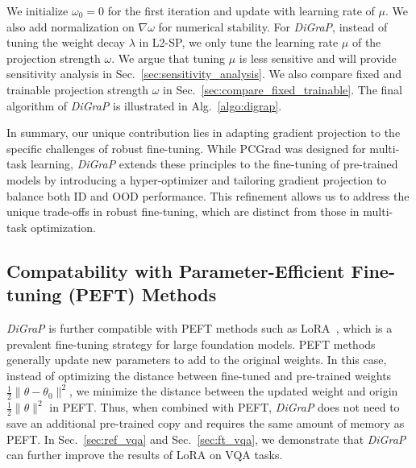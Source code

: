 We initialize $\omega_0=0$ for the first iteration and update with learning rate of $\mu$. We also add normalization on $\nabla\omega$ for numerical stability. For \emph{DiGraP}, instead of tuning the weight decay $\lambda$ in L2-SP, we only tune the learning rate $\mu$ of the projection strength $\omega$. {We argue that tuning $\mu$ is less sensitive and will provide sensitivity analysis in Sec.~\ref{sec:sensitivity_analysis}. We also compare fixed and trainable projection strength $\omega$ in Sec.~\ref{sec:compare_fixed_trainable}.} The final algorithm of \emph{DiGraP} is illustrated in Alg.~\ref{algo:digrap}.



{In summary, our unique contribution lies in adapting gradient projection to the specific challenges of robust fine-tuning. While PCGrad was designed for multi-task learning, \emph{DiGraP} extends these principles to the fine-tuning of pre-trained models by introducing a hyper-optimizer and tailoring gradient projection to balance both ID and OOD performance. This refinement allows us to address the unique trade-offs in robust fine-tuning, which are distinct from those in multi-task optimization. }

\subsection{Compatability with Parameter-Efficient Fine-tuning (PEFT) Methods}

\emph{DiGraP} is further compatible with PEFT methods such as LoRA~\citep{hu_lora_2021}, which is a prevalent fine-tuning strategy for large foundation models. PEFT methods generally update new parameters to add to the original weights. In this case, instead of optimizing the distance between fine-tuned and pre-trained weights $\frac{1}{2}\|\theta - \theta_0\|^2$, we minimize the distance between the updated weight and origin $\frac{1}{2}\|\theta\|^2$ in PEFT. Thus, when combined with PEFT, \emph{DiGraP} does not need to save an additional pre-trained copy and requires the same amount of memory as PEFT. In Sec.~\ref{sec:ref_vqa} and Sec.~\ref{sec:ft_vqa}, we demonstrate that \emph{DiGraP} can further improve the results of LoRA on VQA tasks.


